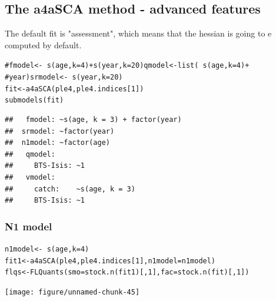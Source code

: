 \documentclass[a4paper,english,10pt]{article}\usepackage[]{graphicx}\usepackage[]{color}
\makeatletter
\newcommand{\hlnum}[1]{\textcolor[rgb]{0.2,0.2,0.2}{#1}}%
\newcommand{\hlcom}[1]{\textcolor[rgb]{0.2,0.267,0.4}{#1}}%
\newcommand{\hlopt}[1]{\textcolor[rgb]{0.2,0.2,0.2}{#1}}%
\newcommand{\hlstd}[1]{\textcolor[rgb]{0,0,0}{#1}}%
\newcommand{\hlkwb}[1]{\textcolor[rgb]{0.361,0.506,0.596}{#1}}%
\newcommand{\hlkwc}[1]{\textcolor[rgb]{0.361,0.506,0.596}{#1}}%
\newcommand{\hlkwd}[1]{\textcolor[rgb]{0.361,0.506,0.596}{#1}}%
\newenvironment{kframe}{%
 \def\at@end@of@kframe{}%
 \ifinner\ifhmode%
  \def\at@end@of@kframe{\end{minipage}}%
  \begin{minipage}{\columnwidth}%
 \fi\fi%
 \def\FrameCommand##1{\hskip\@totalleftmargin \hskip-\fboxsep
 \colorbox{shadecolor}{##1}\hskip-\fboxsep
     \hskip-\linewidth \hskip-\@totalleftmargin \hskip\columnwidth}%
 \MakeFramed {\advance\hsize-\width
   \@totalleftmargin\z@ \linewidth\hsize
   \@setminipage}}%
 {\par\unskip\endMakeFramed%
 \at@end@of@kframe}
\newenvironment{knitrout}{}{} %
\makeatother
\begin{document}
\subsection{The a4aSCA method - advanced features}

The default fit is "assessment", which means that the hessian is going to e computed by default.

\begin{knitrout}
\color{fgcolor}\begin{kframe}
\begin{alltt}
\hlcom{# fmodel <- ~ s(age, k=4) + s(year, k = 20) qmodel <- list( ~ s(age, k=4) +}
\hlcom{# year) srmodel <- ~s(year, k=20)}
\hlstd{fit} \hlkwb{<-} \hlkwd{a4aSCA}\hlstd{(ple4, ple4.indices[}\hlnum{1}\hlstd{])}
\hlkwd{submodels}\hlstd{(fit)}
\end{alltt}
\begin{verbatim}
## 	 fmodel: ~s(age, k = 3) + factor(year)
## 	srmodel: ~factor(year)
## 	n1model: ~factor(age)
## 	 qmodel:
## 	   BTS-Isis: ~1
## 	 vmodel:
## 	   catch:    ~s(age, k = 3)
## 	   BTS-Isis: ~1
\end{verbatim}
\end{kframe}
\end{knitrout}


\subsubsection{N1 model}

\begin{knitrout}
\color{fgcolor}\begin{kframe}
\begin{alltt}
\hlstd{n1model} \hlkwb{<-} \hlopt{~}\hlkwd{s}\hlstd{(age,} \hlkwc{k} \hlstd{=} \hlnum{4}\hlstd{)}
\hlstd{fit1} \hlkwb{<-} \hlkwd{a4aSCA}\hlstd{(ple4, ple4.indices[}\hlnum{1}\hlstd{],} \hlkwc{n1model} \hlstd{= n1model)}
\hlstd{flqs} \hlkwb{<-} \hlkwd{FLQuants}\hlstd{(}\hlkwc{smo} \hlstd{=} \hlkwd{stock.n}\hlstd{(fit1)[,} \hlnum{1}\hlstd{],} \hlkwc{fac} \hlstd{=} \hlkwd{stock.n}\hlstd{(fit)[,} \hlnum{1}\hlstd{])}
\end{alltt}
\end{kframe}
\end{knitrout}


\begin{knitrout}
\color{fgcolor}

{\centering \texttt{[image: figure/unnamed-chunk-45]} 

}



\end{knitrout}
\end{document}
